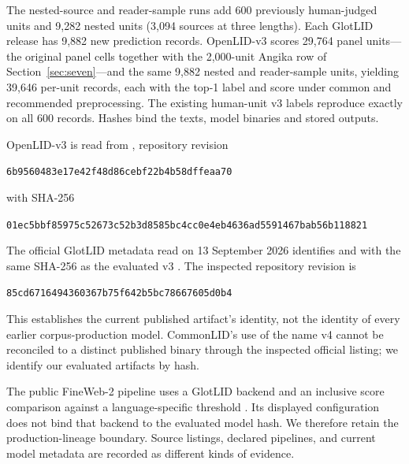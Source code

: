 
The nested-source and reader-sample runs add 600 previously human-judged units and 9,282 nested units (3,094 sources at three lengths). Each GlotLID release has 9,882 new prediction records. OpenLID-v3 scores 29,764 panel units---the original panel cells together with the 2,000-unit Angika row of Section~\ref{sec:seven}---and the same 9,882 nested and reader-sample units, yielding 39,646 per-unit records, each with the top-1 label and score under common and recommended preprocessing. The existing human-unit v3 labels reproduce exactly on all 600 records. Hashes bind the texts, model binaries and stored outputs.

OpenLID-v3 is read from , repository revision
\begin{center}\footnotesize\nolinkurl{6b9560483e17e42f48d86cebf22b4b58dffeaa70}\end{center}
with SHA-256
\begin{center}\footnotesize\nolinkurl{01ec5bbf85975c52673c52b3d8585bc4cc0e4eb4636ad5591467bab56b118821}\end{center}
The official GlotLID metadata read on 13 September 2026 identifies  and  with the same SHA-256 as the evaluated v3 \citep{glotlidmodelcard}. The inspected repository revision is
\begin{center}\footnotesize\nolinkurl{85cd6716494360367b75f642b5bc78667605d0b4}\end{center}
This establishes the current published artifact's identity, not the identity of every earlier corpus-production model. CommonLID's use of the name v4 cannot be reconciled to a distinct published binary through the inspected official listing; we identify our evaluated artifacts by hash.

The public FineWeb-2 pipeline uses a GlotLID backend and an inclusive score comparison against a language-specific threshold \citep{finewebpipeline}. Its displayed configuration does not bind that backend to the evaluated model hash. We therefore retain the production-lineage boundary. Source listings, declared pipelines, and current model metadata are recorded as different kinds of evidence.

